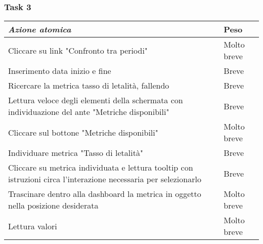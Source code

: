\subsubsection{Task 3}
\label{sss:iaa-task-3}

{
\renewcommand{\arraystretch}{2}
\begin{longtable}[h]{| p{14cm} | p{2.5cm} |}
    \hline
    \textit{Azione atomica} & \textbf{Peso} \\
    \hline
    \endhead
    Cliccare su link "Confronto tra periodi" & Molto breve \\
    \hline
    Inserimento data inizio e fine & Breve  \\
    \hline
    Ricercare la metrica tasso di letalità, fallendo & Breve \\
    \hline
    Lettura veloce degli elementi della schermata con individuazione del ante "Metriche disponibili" & Breve \\
    \hline
    Cliccare sul bottone "Metriche disponibili" & Molto breve \\
    \hline
    Individuare metrica "Tasso di letalità"  & Breve \\
    \hline
    Cliccare su metrica individuata e lettura tooltip con istruzioni circa l'interazione necessaria per selezionarlo & Breve \\
    \hline
    Trascinare dentro alla dashboard la metrica in oggetto nella posizione desiderata & Molto breve \\
    \hline
    Lettura valori & Molto breve \\
    \hline
\end{longtable}
}

